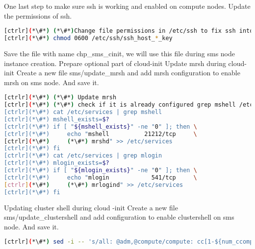 One last step to make sure ssh is working and enabled on compute nodes. Update the permissions of ssh.


\begin{lstlisting}[language=bash,keywords={}]
[ctrlr](*\#*) (*\#*)Change file permissions in /etc/ssh to fix ssh into compute node
[ctrlr](*\#*) chmod 0600 /etc/ssh/ssh_host_*_key
\end{lstlisting}

Save the file with name chp\_sms\_cinit, we will use this file during sms node instance creation.
Prepare optional part of cloud-init
Update mrsh during cloud-init 
Create a new file sms/update\_mrsh and add mrsh configuration to enable mrsh on sms node. And save it. 


\begin{lstlisting}[language=bash,keywords={}]
[ctrlr](*\#*) (*\#*) Update mrsh
[ctrlr](*\#*) (*\#*) check if it is already configured grep mshell /etc/services will [ctrlr](*\#*) return non-zero, else configure"
[ctrlr](*\#*) cat /etc/services | grep mshell
[ctrlr](*\#*) mshell_exists=$?
[ctrlr](*\#*) if [ "${mshell_exists}" -ne "0" ]; then \
[ctrlr](*\#*)     echo "mshell          21212/tcp     \             
[ctrlr](*\#*)     (*\#*) mrshd" >> /etc/services
[ctrlr](*\#*) fi
[ctrlr](*\#*) cat /etc/services | grep mlogin
[ctrlr](*\#*) mlogin_exists=$?
[ctrlr](*\#*) if [ "${mlogin_exists}" -ne "0" ]; then \
[ctrlr](*\#*)     echo "mlogin            541/tcp     \
[ctrlr](*\#*)     (*\#*) mrlogind" >> /etc/services
[ctrlr](*\#*) fi
\end{lstlisting}


Updating cluster shell during cloud -init
Create a new file sms/update\_clustershell and add configuration to enable clustershell on sms node. And save it. 


\begin{lstlisting}[language=bash,keywords={}]
[ctrlr](*\#*) sed -i -- 's/all: @adm,@compute/compute: cc[1-${num_ccomputes}]\n&/' /etc/clustershell/groups.d/local.cfg
\end{lstlisting}